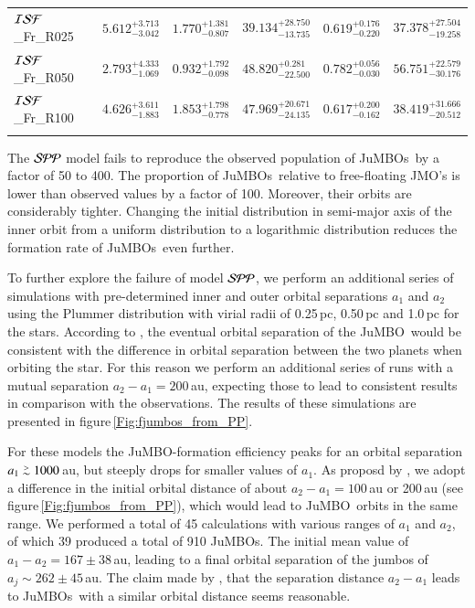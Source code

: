 \documentclass[aa]{lib/aa}
\def\apgt{\ {\raise-.5ex\hbox{$\buildrel>\over\sim$}}\ }
\newcommand{\jumbo}{\mbox{JuMBO}}
\newcommand{\jumbos}{\mbox{JuMBOs}}
\begin{document}
\begin{table}
\begin{tabular}{llllll}
 ${\cal ISF}$\_Fr\_R025 &$5.612^{+3.713}_{-3.042}$ & $1.770^{+1.381}_{-0.807}$ & $39.134^{+28.750}_{-13.735}$ & $0.619^{+0.176}_{-0.220}$& $37.378^{+27.504}_{-19.258}$  \\
 ${\cal ISF}$\_Fr\_R050 &$2.793^{+4.333}_{-1.069}$ & $0.932^{+1.792}_{-0.098}$ & $48.820^{+0.281}_{-22.500}$ & $0.782^{+0.056}_{-0.030}$& $56.751^{+22.579}_{-30.176}$  \\
 ${\cal ISF}$\_Fr\_R100 &$4.626^{+3.611}_{-1.883}$ & $1.853^{+1.798}_{-0.778}$ & $47.969^{+20.671}_{-24.135}$ & $0.617^{+0.200}_{-0.162}$& $38.419^{+31.666}_{-20.512}$  \\
 \hline \vspace{-0.75em}  \\
 \end{tabular}
\end{table}

The ${\cal SPP}$ model fails to reproduce the observed population of
\jumbos\, by a factor of 50 to 400.  The proportion of \jumbos\,
relative to free-floating JMO's is lower than observed values by a
factor of 100. Moreover, their orbits are considerably tighter.
Changing the initial distribution in semi-major axis of the inner
orbit from a uniform distribution to a logarithmic distribution
reduces the formation rate of \jumbos\, even further.

To further explore the failure of model ${\cal SPP}$, we perform an
additional series of simulations with pre-determined inner and outer
orbital separations $a_1$ and $a_2$ using the Plummer distribution
with virial radii of 0.25\,pc, 0.50\,pc and 1.0\,pc for the stars.
According to \citep{2023arXiv231006016W}, the eventual orbital
separation of the \jumbo\, would be consistent with the difference in
orbital separation between the two planets when orbiting the star. For
this reason we perform an additional series of runs with a mutual
separation $a_2-a_1 = 200$\,au, expecting those to lead to consistent
results in comparison with the observations.  The results of these
simulations are presented in figure\,\ref{Fig:fjumbos_from_PP}.

For these models the \jumbo-formation efficiency peaks for an orbital
separation $a_1 \apgt 1000$\,au, but steeply drops for smaller values
of $a_1$. As proposd by \citep{2023arXiv231006016W}, we adopt a
difference in the initial orbital distance of about $a_2-a_1 =
100$\,au or 200\,au (see figure\,\ref{Fig:fjumbos_from_PP}), which
would lead to \jumbo\, orbits in the same range.  We performed a total
of 45 calculations with various ranges of $a_1$ and $a_2$, of which 39
produced a total of 910 \jumbos. The initial mean value of $a_1-a_2 =
167\pm38$\,au, leading to a final orbital separation of the jumbos of
$a_j \sim 262\pm45$\,au.  The claim made by
\citep{2023arXiv231006016W}, that the separation distance $a_2-a_1$
leads to \jumbos\, with a similar orbital distance seems reasonable.
\end{document}
